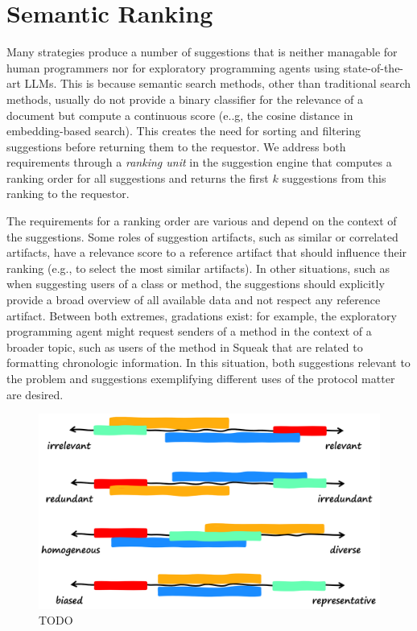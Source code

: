
\section{Semantic Ranking}
\label{sec:suggestions/ranking}

Many strategies produce a number of suggestions that is neither managable for human programmers nor for exploratory programming agents using state-of-the-art LLMs.
This is because semantic search methods, other than traditional search methods, usually do not provide a binary classifier for the relevance of a document but compute a continuous score (e..g, the cosine distance in embedding-based search).
This creates the need for sorting and filtering suggestions before returning them to the requestor.
We address both requirements through a \emph{ranking unit} in the suggestion engine that computes a ranking order for all suggestions and returns the first $k$ suggestions from this ranking to the requestor.

The requirements for a ranking order are various and depend on the context of the suggestions.
Some roles of suggestion artifacts, such as similar or correlated artifacts, have a relevance score to a reference artifact that should influence their ranking (e.g., to select the most similar artifacts).
In other situations, such as when suggesting users of a class or method, the suggestions should explicitly provide a broad overview of all available data and not respect any reference artifact.
Between both extremes, gradations exist: for example, the exploratory programming agent might request senders of a method in the context of a broader topic, such as users of the  method in Squeak that are related to formatting chronologic information.
In this situation, both suggestions relevant to the problem and suggestions exemplifying different uses of the protocol matter are desired.

\begin{figure}
	\centering
	\includegraphics[width=\textwidth]{03_ranking/method_objectives}
	\caption[TODO]{
		TODO
	}
	\label{fig:suggestions/ranking/method_objectives}
\end{figure}

